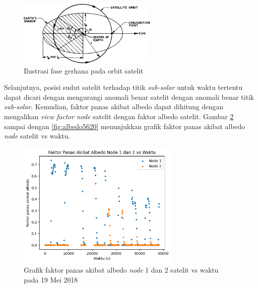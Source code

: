 \begin{figure}[H]
\setlength{}
\begin{center}
\includegraphics[width=0.6\textwidth]{fig/ssp.jpg}
	\caption[Ilustrasi fase gerhana pada orbit satelit]{Ilustrasi fase gerhana pada orbit satelit~\cite{ismail2015}}
\label{fig:ssp}
\end{center}
\end{figure}

Selanjutnya, posisi sudut satelit terhadap titik \textit{sub-solar} untuk waktu
tertentu dapat dicari dengan mengurangi anomali benar satelit dengan anomali
benar titik \textit{sub-solar}. Kemudian, faktor panas akibat albedo dapat
dihitung dengan mengalikan \textit{view factor node} satelit dengan faktor
albedo satelit. Gambar \ref{fig:albedo1219} sampai dengan \ref{fig:albedo5620}
menunjukkan grafik faktor panas akibat albedo \textit{node} satelit vs waktu.

\begin{figure}[H]
\setlength{}
\begin{center}
\includegraphics[width=0.7\textwidth]{fig/albedo_node12_2018-05-19.png}
	\caption{Grafik faktor panas akibat albedo \textit{node} 1 dan 2 satelit vs waktu pada 19 Mei 2018}
\label{fig:albedo1219}
\end{center}
\end{figure}

